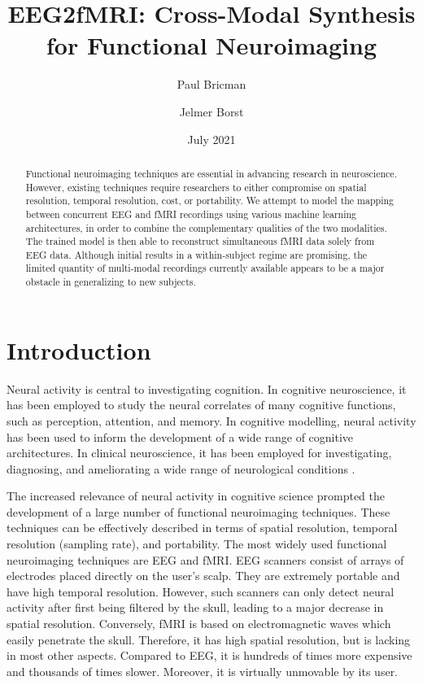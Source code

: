 \documentclass{article}
\title{EEG2fMRI: Cross-Modal Synthesis for Functional Neuroimaging}
\author{Paul Bricman}
\author{Jelmer Borst}
\affil{University of Groningen}
\date{July 2021}
\begin{document}
\maketitle

\begin{abstract}
    Functional neuroimaging techniques are essential in advancing research in neuroscience. However, existing techniques require researchers to either compromise on spatial resolution, temporal resolution, cost, or portability. We attempt to model the  mapping between concurrent EEG and fMRI recordings using various machine learning architectures, in order to combine the complementary qualities of the two modalities. The trained model is then able to reconstruct simultaneous fMRI data solely from EEG data. Although initial results in a within-subject regime are promising, the limited quantity of multi-modal recordings currently available appears to be a major obstacle in generalizing to new subjects.
\end{abstract}

\section{Introduction}

Neural activity is central to investigating cognition. In cognitive neuroscience, it has been employed to study the neural correlates of many cognitive functions, such as perception, attention, and memory. In cognitive modelling, neural activity has been used to inform the development of a wide range of cognitive architectures. In clinical neuroscience, it has been employed for investigating, diagnosing, and ameliorating a wide range of neurological conditions \cite{n_functional_2015}.

The increased relevance of neural activity in cognitive science prompted the development of a large number of functional neuroimaging techniques. These techniques can be effectively described in terms of spatial resolution, temporal resolution (sampling rate), and portability. The most widely used functional neuroimaging techniques are EEG and fMRI. EEG scanners consist of arrays of electrodes placed directly on the user's scalp. They are extremely portable and have high temporal resolution. However, such scanners can only detect neural activity after first being filtered by the skull, leading to a major decrease in spatial resolution. Conversely, fMRI is based on electromagnetic waves which easily penetrate the skull. Therefore, it has high spatial resolution, but is lacking in most other aspects. Compared to EEG, it is hundreds of times more expensive and thousands of times slower. Moreover, it is virtually unmovable by its user.
\end{document}
